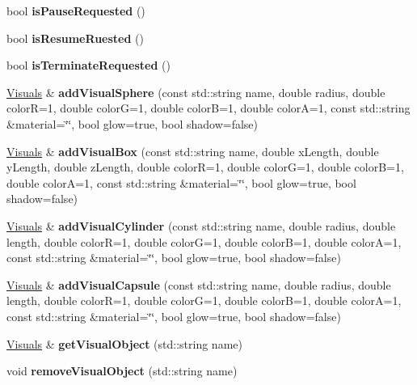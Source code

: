 \begin{DoxyCompactItemize}
bool {\bfseries is\+Pause\+Requested} ()
\item 
\mbox{\label{classraisim_1_1RaisimServer_a4a42ba06bec0437fa0072ddb949f9a56}} 
bool {\bfseries is\+Resume\+Ruested} ()
\item 
\mbox{\label{classraisim_1_1RaisimServer_a6781865462ef0ffd41cc2718449484a2}} 
bool {\bfseries is\+Terminate\+Requested} ()
\item 
\mbox{\label{classraisim_1_1RaisimServer_a8827d78f85ed8764f2c1a2d1f3292ae5}} 
\hyperlink{structraisim_1_1Visuals}{Visuals} \& {\bfseries add\+Visual\+Sphere} (const std\+::string name, double radius, double colorR=1, double colorG=1, double colorB=1, double colorA=1, const std\+::string \&material=\char`\"{}\char`\"{}, bool glow=true, bool shadow=false)
\item 
\mbox{\label{classraisim_1_1RaisimServer_aa8174f08cfe8b6095daa232dad328e9b}} 
\hyperlink{structraisim_1_1Visuals}{Visuals} \& {\bfseries add\+Visual\+Box} (const std\+::string name, double x\+Length, double y\+Length, double z\+Length, double colorR=1, double colorG=1, double colorB=1, double colorA=1, const std\+::string \&material=\char`\"{}\char`\"{}, bool glow=true, bool shadow=false)
\item 
\mbox{\label{classraisim_1_1RaisimServer_a1d4e079ecf9ea92c1e6ddf9bf52da5a9}} 
\hyperlink{structraisim_1_1Visuals}{Visuals} \& {\bfseries add\+Visual\+Cylinder} (const std\+::string name, double radius, double length, double colorR=1, double colorG=1, double colorB=1, double colorA=1, const std\+::string \&material=\char`\"{}\char`\"{}, bool glow=true, bool shadow=false)
\item 
\mbox{\label{classraisim_1_1RaisimServer_a8a5d29b8c36bd422fd30acb474ea2bbc}} 
\hyperlink{structraisim_1_1Visuals}{Visuals} \& {\bfseries add\+Visual\+Capsule} (const std\+::string name, double radius, double length, double colorR=1, double colorG=1, double colorB=1, double colorA=1, const std\+::string \&material=\char`\"{}\char`\"{}, bool glow=true, bool shadow=false)
\item 
\mbox{\label{classraisim_1_1RaisimServer_a10ff761b4536607df44286b2e8d15180}} 
\hyperlink{structraisim_1_1Visuals}{Visuals} \& {\bfseries get\+Visual\+Object} (std\+::string name)
\item 
\mbox{\label{classraisim_1_1RaisimServer_a1ac814dd8c20d8b543861acdc58adf8c}} 
void {\bfseries remove\+Visual\+Object} (std\+::string name)
\end{DoxyCompactItemize}
